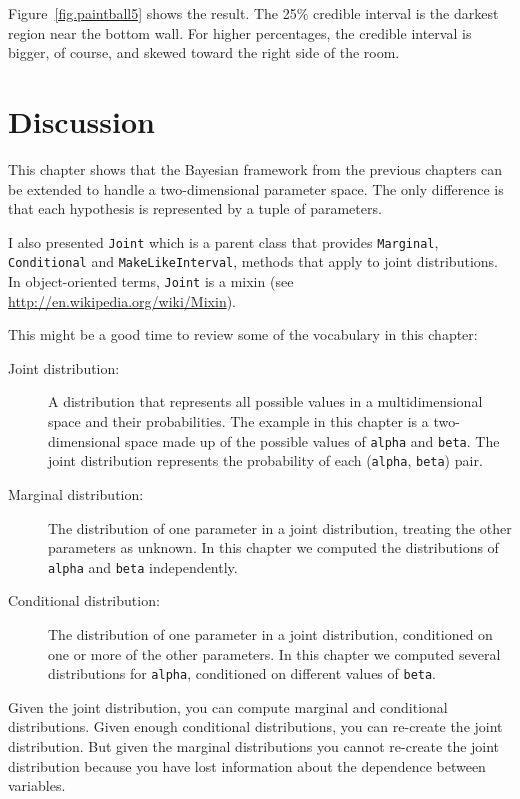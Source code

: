 \documentclass[12pt]{book}
\begin{document}
Figure~\ref{fig.paintball5} shows the result.  The 25\% credible
interval is the darkest region near the bottom wall.  For higher
percentages, the credible interval is bigger, of course, and skewed
toward the right side of the room.


\section{Discussion}

This chapter shows that the Bayesian framework from the previous
chapters can be extended to handle a two-dimensional parameter space.
The only difference is that each hypothesis is represented by
a tuple of parameters.

I also presented {\tt Joint} which is a parent class that provides
{\tt Marginal}, {\tt Conditional} and {\tt MakeLikeInterval}, methods
that apply to joint distributions.  In object-oriented terms,
{\tt Joint} is a mixin (see \url{http://en.wikipedia.org/wiki/Mixin}).

This might be a good time to review some of the vocabulary in this
chapter:

\begin{description}

\item[Joint distribution:] A distribution that represents all possible
values in a multidimensional space and their probabilities.  The example
in this chapter is a two-dimensional space made up of the possible
values of {\tt alpha} and {\tt beta}.  The joint distribution represents
the probability of each ({\tt alpha}, {\tt beta}) pair.

\item[Marginal distribution:] The distribution of one parameter in a
joint distribution, treating the other parameters as unknown.  In
this chapter we computed the distributions of {\tt alpha} and {\tt beta}
independently.

\item[Conditional distribution:] The distribution of one parameter in
a joint distribution, conditioned on one or more of the other parameters.
In this chapter we computed several distributions for {\tt alpha}, conditioned
on different values of {\tt beta}.

\end{description}

Given the joint distribution, you can compute marginal and conditional
distributions.  Given enough conditional distributions, you
can re-create the joint distribution.  But given the marginal distributions
you cannot re-create the joint distribution because you have lost
information about the dependence between variables.
\end{document}
